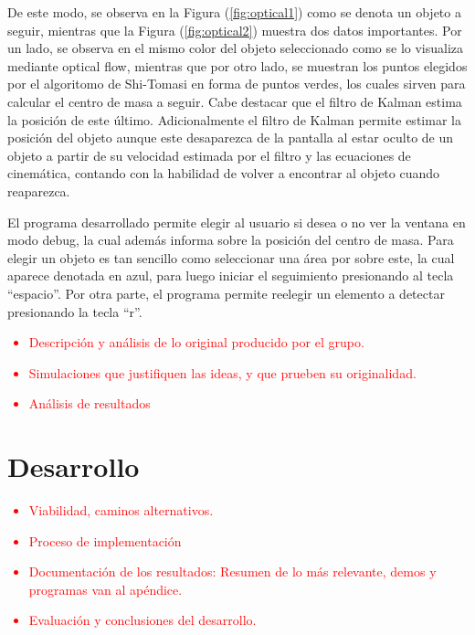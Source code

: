 De este modo, se observa en la Figura (\ref{fig:optical1}) como se denota un objeto a seguir, mientras que la Figura (\ref{fig:optical2}) muestra dos datos importantes. Por un lado, se observa en el mismo color del objeto seleccionado como se lo visualiza mediante optical flow, mientras que por otro lado, se muestran los puntos elegidos por el algoritomo de Shi-Tomasi en forma de puntos verdes, los cuales sirven para calcular el centro de masa a seguir. Cabe destacar que el filtro de Kalman estima la posición de este último. Adicionalmente el filtro de Kalman permite estimar la posición del objeto aunque este desaparezca de la pantalla al estar oculto de un objeto a partir de su velocidad estimada por el filtro y las ecuaciones de cinemática, contando con la habilidad de volver a encontrar al objeto cuando reaparezca.

El programa desarrollado permite elegir al usuario si desea o no ver la ventana en modo debug, la cual además informa sobre la posición del centro de masa. Para elegir un objeto es tan sencillo como seleccionar una área por sobre este, la cual aparece denotada en azul, para luego iniciar el seguimiento presionando al tecla ``espacio''. Por otra parte, el programa permite reelegir un elemento a detectar presionando la tecla ``r''.


\textcolor{red}{
\begin{itemize}
	\item Descripción y análisis de lo original producido por el grupo.
	\item Simulaciones que justifiquen las ideas, y que prueben su originalidad.
	\item Análisis de resultados
\end{itemize}
}

\section{Desarrollo}

\textcolor{red}{
\begin{itemize}
	\item Viabilidad, caminos alternativos.
	\item Proceso de implementación
	\item Documentación de los resultados: Resumen de lo más relevante, demos y programas van al apéndice.
	\item Evaluación y conclusiones del desarrollo.
\end{itemize}
}
